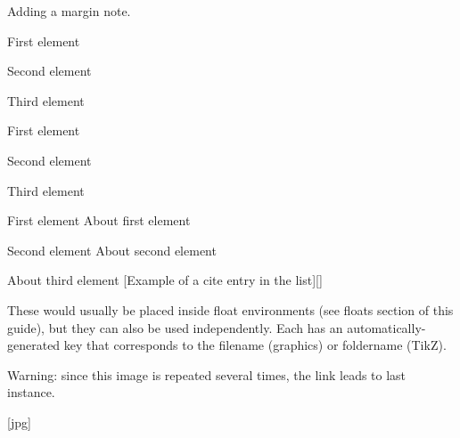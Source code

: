 Adding a margin note. 


\begin{wrtxListEnumerate}
  \item First element
  \item Second element
  \item Third element
\end{wrtxListEnumerate}
\begin{wrtxListItemize}
  \item First element
  \item Second element
  \item Third element
\end{wrtxListItemize}

\begin{wrtxListMeta}
  \item[First element] About first element
  \item[Second element] About second element
  \item[\wrtxListLabelStyle{Third element styled}] About third element
  [Example of a cite entry in the list][]%
\end{wrtxListMeta}


These would usually be placed inside float environments (see floats section of this guide), but they can also be used independently.
Each has an automatically-generated key that corresponds to the filename (graphics) or foldername (TikZ).

\textcolor{wrtxColorWarning}{Warning: since this image is repeated several times, the link leads to last instance.}


[jpg]%




